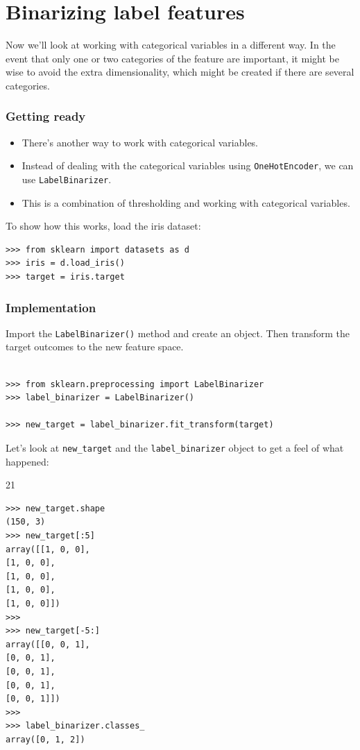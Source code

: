 \documentclass[SKL-MASTER.tex]{subfiles}
\begin{document}
\newpage
\section*{Binarizing label features}
Now we'll look at working with categorical variables in a different way. In the event
that only one or two categories of the feature are important, it might be wise to avoid the
extra dimensionality, which might be created if there are several categories.
\subsubsection*{Getting ready}
\begin{itemize}
\item There's another way to work with categorical variables.
\item Instead of dealing with the categorical
variables using \texttt{OneHotEncoder}, we can use \texttt{LabelBinarizer}. 
\item This is a combination of
thresholding and working with categorical variables.
\end{itemize}

To show how this works, load the iris dataset:
\begin{framed}
\begin{verbatim}
>>> from sklearn import datasets as d
>>> iris = d.load_iris()
>>> target = iris.target
\end{verbatim}
\end{framed}
\subsubsection*{Implementation}
Import the \texttt{LabelBinarizer()} method and create an object. Then transform the target outcomes to the new feature space.
\begin{framed}
\begin{verbatim}

>>> from sklearn.preprocessing import LabelBinarizer
>>> label_binarizer = LabelBinarizer()

>>> new_target = label_binarizer.fit_transform(target)
\end{verbatim}
\end{framed}
Let's look at \texttt{new\_target} and the \texttt{label\_binarizer} object to get a feel of what happened:

21
\begin{framed}
\begin{verbatim}
>>> new_target.shape
(150, 3)
>>> new_target[:5]
array([[1, 0, 0],
[1, 0, 0],
[1, 0, 0],
[1, 0, 0],
[1, 0, 0]])
>>>
>>> new_target[-5:]
array([[0, 0, 1],
[0, 0, 1],
[0, 0, 1],
[0, 0, 1],
[0, 0, 1]])
>>>
>>> label_binarizer.classes_
array([0, 1, 2])
\end{verbatim}
\end{framed}
\end{document}
